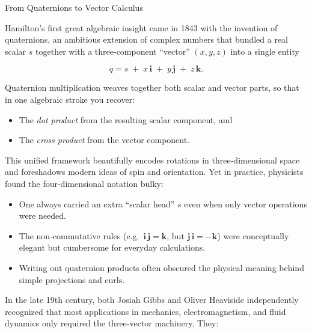 \begin{HistoricalSidebar}{From Quaternions to Vector Calculus}

    Hamilton’s first great algebraic insight came in 1843 with the invention of quaternions, an ambitious extension of complex numbers that bundled a real scalar \(s\) together with a three‐component “vector” \((x,y,z)\) into a single entity
    
    \[
    q = s \;+\; x\,\mathbf i \;+\; y\,\mathbf j \;+\; z\,\mathbf k.
    \]
    
    Quaternion multiplication weaves together both scalar and vector parts, so that in one algebraic stroke you recover:

    \medskip
    
    \begin{itemize}
      \item The \emph{dot product} from the resulting scalar component, and  
      \item The \emph{cross product} from the vector component.  
    \end{itemize}

    \medskip
    
    This unified framework beautifully encodes rotations in three‐dimensional space and foreshadows modern ideas of spin and orientation.  Yet in practice, physicists found the four‐dimensional notation bulky:

    \medskip
    
    \begin{itemize}
      \item One always carried an extra “scalar head” \(s\) even when only vector operations were needed.
      \item The non‐commutative rules (e.g.\ \(\mathbf i\,\mathbf j = \mathbf k\), but \(\mathbf j\,\mathbf i = -\mathbf k\)) were conceptually elegant but cumbersome for everyday calculations.
      \item Writing out quaternion products often obscured the physical meaning behind simple projections and curls.  
    \end{itemize}

    \medskip
    
    In the late 19th century, both Josiah Gibbs and Oliver Heaviside independently recognized that most applications in mechanics, electromagnetism, and fluid dynamics only required the three‐vector machinery.  They:

    \medskip
    

\end{HistoricalSidebar}
